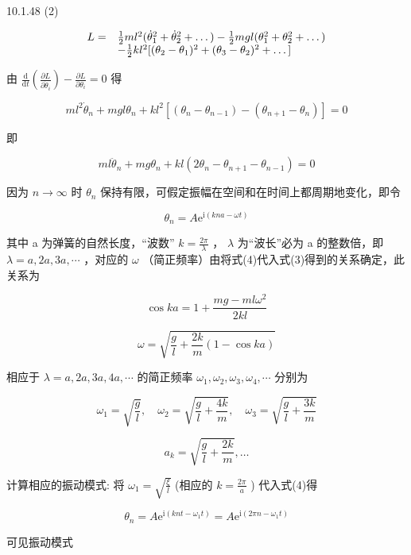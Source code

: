 \begin{problem}{10.1.48}
(2) 

\[
\begin{array}{r l} L = & \frac {1}{2} m l ^ {2} (\dot {\theta} _ {1} ^ {2} + \dot {\theta} _ {2} ^ {2} + \dots) - \frac {1}{2} m g l (\theta_ {1} ^ {2} + \theta_ {2} ^ {2} + \dots) \\ & - \frac {1}{2} k l ^ {2} [ (\theta_ {2} - \theta_ {1}) ^ {2} + (\theta_ {3} - \theta_ {2}) ^ {2} + \dots ] \end{array}
\]

由 $\frac{\mathrm{d}}{\mathrm{d}t}\left(\frac{\partial L}{\partial\dot{\theta}_i}\right) - \frac{\partial L}{\partial\theta_i} = 0$ 得

\[
m l ^ {2} \dot {\theta} _ {n} + m g l \theta_ {n} + k l ^ {2} \left[ \left(\theta_ {n} - \theta_ {n - 1}\right) - \left(\theta_ {n + 1} - \theta_ {n}\right) \right] = 0
\]

即

\[
m l \ddot {\theta} _ {n} + m g \theta_ {n} + k l (2 \theta_ {n} - \theta_ {n + 1} - \theta_ {n - 1}) = 0\tag{3}
\]

因为 $n \to \infty$ 时 $\theta_{n}$ 保持有限，可假定振幅在空间和在时间上都周期地变化，即令

\[
\theta_ {n} = A \mathrm{e} ^ {\mathrm{i} (k n a - \omega t)}\tag{4}
\]

其中 a 为弹簧的自然长度，“波数” $k=\frac{2\pi}{\lambda}$ ， $\lambda$ 为“波长”必为 a 的整数倍，即 $\lambda=a,2a,3a,\cdots$ ，对应的 $\omega$ （简正频率）由将式(4)代入式(3)得到的关系确定，此关系为

\[
\cos k a = 1 + \frac {m g - m l \omega^ {2}}{2 k l}
\]

\[
\omega = \sqrt {\frac {g}{l} + \frac {2 k}{m} (1 - \cos k a)}
\]

相应于 $\lambda=a,2a,3a,4a,\cdots$ 的简正频率 $\omega_{1},\omega_{2},\omega_{3},\omega_{4},\cdots$ 分别为

\[
\omega_ {1} = \sqrt {\frac {g}{l}}, \quad \omega_ {2} = \sqrt {\frac {g}{l} + \frac {4 k}{m}}, \quad \omega_ {3} = \sqrt {\frac {g}{l} + \frac {3 k}{m}}
\]

\[
a _ {k} = \sqrt {\frac {g}{l} + \frac {2 k}{m}}, \dots
\]

计算相应的振动模式: 将 $\omega_{1}=\sqrt{\frac{\xi}{l}}$ (相应的 $k=\frac{2\pi}{a}$ ) 代入式(4)得

\[
\theta_ {n} = A \mathrm{e} ^ {\mathrm{i} (k n t - \omega_ {1} t)} = A \mathrm{e} ^ {\mathrm{i} (2 \pi n - \omega_ {1} t)}
\]

可见振动模式


\end{problem}
